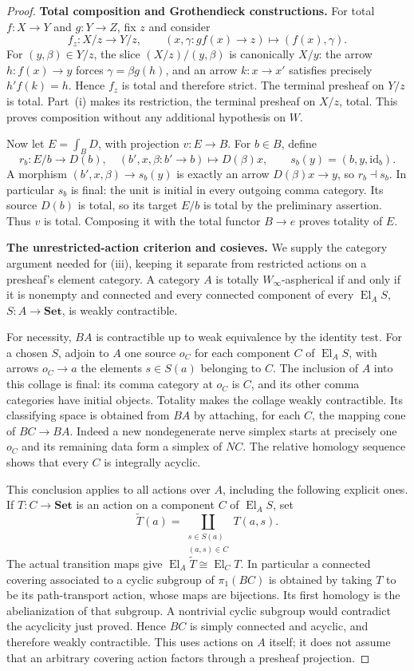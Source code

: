 \documentclass[11pt,a4paper]{article}
\theoremstyle{definition}
\theoremstyle{remark}
\newcommand{\Set}{\mathbf{Set}}
\newcommand{\id}{\mathrm{id}}
\newcommand{\Winfty}{W_\infty}
\newcommand{\El}{\operatorname{El}}
\begin{document}
\begin{proof}
\textbf{Total composition and Grothendieck constructions.}
For total $f:X\to Y$ and $g:Y\to Z$, fix $z$ and consider
\[
 f_z:X/z\longrightarrow Y/z,
 \qquad (x,\gamma:gf(x)\to z)\longmapsto(f(x),\gamma).
\]
For $(y,\beta)\in Y/z$, the slice $(X/z)/(y,\beta)$ is canonically $X/y$: the arrow $h:f(x)\to y$ forces $\gamma=\beta g(h)$, and an arrow $k:x\to x'$ satisfies precisely $h'f(k)=h$. Hence $f_z$ is total and therefore strict. The terminal presheaf on $Y/z$ is total. Part~(i) makes its restriction, the terminal presheaf on $X/z$, total. This proves composition without any additional hypothesis on $W$.

Now let $E=\int_BD$, with projection $v:E\to B$. For $b\in B$, define
\[
 r_b:E/b\longrightarrow D(b),\quad
 (b',x,\beta:b'\to b)\longmapsto D(\beta)x,
 \qquad s_b(y)=(b,y,\id_b).
\]
A morphism $(b',x,\beta)\to s_b(y)$ is exactly an arrow $D(\beta)x\to y$, so $r_b\dashv s_b$. In particular $s_b$ is final: the unit is initial in every outgoing comma category. Its source $D(b)$ is total, so its target $E/b$ is total by the preliminary assertion. Thus $v$ is total. Composing it with the total functor $B\to e$ proves totality of $E$.

\textbf{The unrestricted-action criterion and cosieves.}
We supply the category argument needed for (iii), keeping it separate from restricted actions on a presheaf's element category. A category $A$ is totally $\Winfty$-aspherical if and only if it is nonempty and connected and every connected component of every $\El_A S$, $S:A\to\Set$, is weakly contractible.

For necessity, $BA$ is contractible up to weak equivalence by the identity test. For a chosen $S$, adjoin to $A$ one source $o_C$ for each component $C$ of $\El_A S$, with arrows $o_C\to a$ the elements $s\in S(a)$ belonging to $C$. The inclusion of $A$ into this collage is final: its comma category at $o_C$ is $C$, and its other comma categories have initial objects. Totality makes the collage weakly contractible. Its classifying space is obtained from $BA$ by attaching, for each $C$, the mapping cone of $BC\to BA$. Indeed a new nondegenerate nerve simplex starts at precisely one $o_C$ and its remaining data form a simplex of $NC$. The relative homology sequence shows that every $C$ is integrally acyclic.

This conclusion applies to all actions over $A$, including the following explicit ones. If $T:C\to\Set$ is an action on a component $C$ of $\El_A S$, set
\[
 \widetilde T(a)=
 \coprod_{\substack{s\in S(a)\\(a,s)\in C}}T(a,s).
\]
The actual transition maps give $\El_A\widetilde T\cong\El_C T$. In particular a connected covering associated to a cyclic subgroup of $\pi_1(BC)$ is obtained by taking $T$ to be its path-transport action, whose maps are bijections. Its first homology is the abelianization of that subgroup. A nontrivial cyclic subgroup would contradict the acyclicity just proved. Hence $BC$ is simply connected and acyclic, and therefore weakly contractible. This uses actions on $A$ itself; it does not assume that an arbitrary covering action factors through a presheaf projection.


\end{proof}
\end{document}
